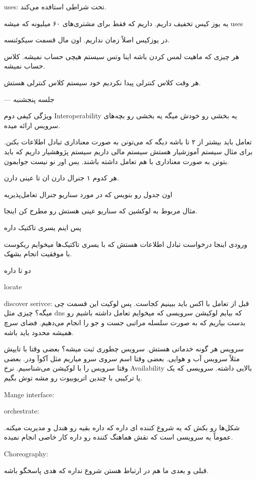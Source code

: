 uses: تحت شراطی استافده می‌کند.

یه یوز کیس تخفیف داریم. داریم که فقط برای مشتری‌های ۶۰ میلیونه که میشه uses

در یوزکیس اصلاً زمان نداریم. اون مال قسمت سیکوئنسه.

هر چیزی که ماهیت لمس کردن باشه اینا وتس سیستم هیچی حساب نمیشه. کلاس حساب نمیشه.

هر وقت کلاس کنترلی پیدا نکردیم خود سیستم کلاس کنترلی هستش.

--- جلسه پنجشنبه

ویژگی کیفی دوم Interoperability یه بخشی رو خودش میگه یه بخشی رو بچه‌های سرویس
ارائه میده.

تعامل باید بیشتر از ۲ تا باشه دیگه که می‌تونن به صورت معناداری تبادل اطلاعات
بکنن. برای مثال سیستم آموزشیار هستش سیستم مالی داریم سیستم پژوهشیار داریم که
باید بتونن به صورت معناداری با هم تعامل داشته باشند. یس اور نو نیست جوابمون.

هر کدوم ۱ جنرال دارن
ان تا عینی دارن.

اون جدول رو بنویس که در مورد سناریو جنرال تعامل‌پذیریه

مثال مربوط به لوکشین که سناریو عینی هستش رو مطرح کن اینجا.

پس اینم یسری تاکتیک داره

ورودی اینجا درخواست تبادل اطلاعات هستش که با یسری تاکتیک‌ها میخوایم ریکوست با
موفقیت انجام بشهک.

دو تا داره

locate

discover serivce: قبل از تعامل با اکس باید ببینیم کجاست. پس لوکیت این قسمت چی
میگه؟ چیزی مثل dns که بیایم لوکیشن سرویسی که میخوایم تعامل داشته باشیم رو بدست
بیاریم که به صورت سلسله مراتبی جست و جو را انجام می‌دهیم. فضای سرچ همیشه محدود
باید باشه.

سرویس هر گونه خدماتی هستش. سرویس چطوری ثبت میشه؟ بعضی وقتا با تایپش مثلاً سرویس
آب و هوایی. بعضی وقتا اسم سروی سرو میاریم مثل آکوآ ودر. بعضی وقتا سرویس را با
لوکیشن می‌شناسیم. نرخ Availability بالایی داشته. سرویسی که  یک یا ترکیبی با
چندین اتریوبیوت رو مشه توش بگیم. 

Mange interface:

orchestrate:

شکل‌ها رو بکش که یه شروع کننده ای داره که داره بقیه رو هندل و مدیریت میکنه.
عموماً یه سرویسی است که نقش هماهنگ کننده رو داره کار خاصی انجام نمیده.

Choreography:

قبلی و بعدی ما هم در ارتباط هستن شروع نداره که هدی پاسخگو باشه.

